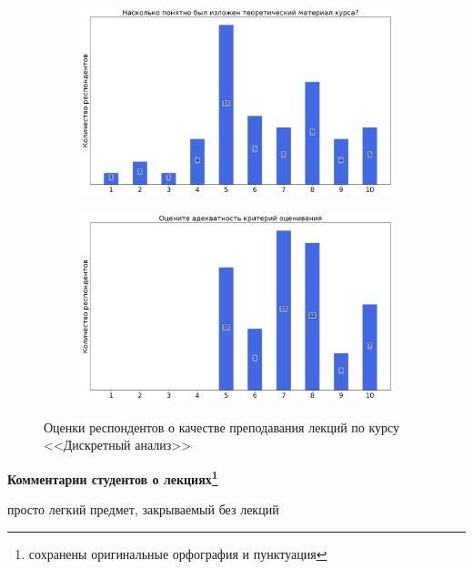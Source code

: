 \begin{figure}[H]
\begin{subfigure}[b]{0.45\textwidth}
			\end{subfigure}
			\begin{subfigure}[b]{0.45\textwidth}
				\centering
				\includegraphics[width=\textwidth]{images/1 course/Дискретный анализ/lecturer-marks-Ильинский Д.Г.-2.png}
			\end{subfigure}	
			\begin{subfigure}[b]{0.45\textwidth}
				\centering
				\includegraphics[width=\textwidth]{images/1 course/Дискретный анализ/lecturer-marks-Ильинский Д.Г.-3.png}
			\end{subfigure}
			\caption{Оценки респондентов о качестве преподавания лекций по курсу <<Дискретный анализ>>}
		\end{figure}

		\textbf{Комментарии студентов о лекциях\protect\footnote{сохранены оригинальные орфография и пунктуация}}
            \begin{commentbox} 
                просто  легкий предмет, закрываемый без лекций 
            \end{commentbox} 
        
